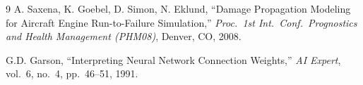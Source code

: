 \documentclass[11pt,a4paper]{article}
\begin{document}
\begin{thebibliography}{9}
  A. Saxena, K. Goebel, D. Simon, N. Eklund,
  ``Damage Propagation Modeling for Aircraft Engine Run-to-Failure Simulation,''
  \textit{Proc.\ 1st Int.\ Conf.\ Prognostics and Health Management (PHM08)},
  Denver, CO, 2008.

  G.D. Garson,
  ``Interpreting Neural Network Connection Weights,''
  \textit{AI Expert}, vol.~6, no.~4, pp.~46--51, 1991.
\end{thebibliography}
\end{document}
